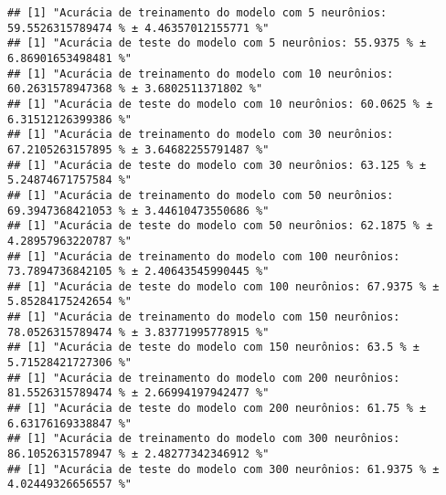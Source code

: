 \documentclass[
]{article}
\newenvironment{Shaded}{\begin{snugshade}}{\end{snugshade}}
\newcommand{\CommentTok}[1]{\textcolor[rgb]{0.56,0.35,0.01}{\textit{#1}}}
\newcommand{\DecValTok}[1]{\textcolor[rgb]{0.00,0.00,0.81}{#1}}
\newcommand{\KeywordTok}[1]{\textcolor[rgb]{0.13,0.29,0.53}{\textbf{#1}}}
\newcommand{\NormalTok}[1]{#1}
\newcommand{\OperatorTok}[1]{\textcolor[rgb]{0.81,0.36,0.00}{\textbf{#1}}}
\newcommand{\StringTok}[1]{\textcolor[rgb]{0.31,0.60,0.02}{#1}}
\begin{document}
\begin{Shaded}
\end{Shaded}

\begin{verbatim}
## [1] "Acurácia de treinamento do modelo com 5 neurônios: 59.5526315789474 % ± 4.46357012155771 %"
## [1] "Acurácia de teste do modelo com 5 neurônios: 55.9375 % ± 6.86901653498481 %"
## [1] "Acurácia de treinamento do modelo com 10 neurônios: 60.2631578947368 % ± 3.6802511371802 %"
## [1] "Acurácia de teste do modelo com 10 neurônios: 60.0625 % ± 6.31512126399386 %"
## [1] "Acurácia de treinamento do modelo com 30 neurônios: 67.2105263157895 % ± 3.64682255791487 %"
## [1] "Acurácia de teste do modelo com 30 neurônios: 63.125 % ± 5.24874671757584 %"
## [1] "Acurácia de treinamento do modelo com 50 neurônios: 69.3947368421053 % ± 3.44610473550686 %"
## [1] "Acurácia de teste do modelo com 50 neurônios: 62.1875 % ± 4.28957963220787 %"
## [1] "Acurácia de treinamento do modelo com 100 neurônios: 73.7894736842105 % ± 2.40643545990445 %"
## [1] "Acurácia de teste do modelo com 100 neurônios: 67.9375 % ± 5.85284175242654 %"
## [1] "Acurácia de treinamento do modelo com 150 neurônios: 78.0526315789474 % ± 3.83771995778915 %"
## [1] "Acurácia de teste do modelo com 150 neurônios: 63.5 % ± 5.71528421727306 %"
## [1] "Acurácia de treinamento do modelo com 200 neurônios: 81.5526315789474 % ± 2.66994197942477 %"
## [1] "Acurácia de teste do modelo com 200 neurônios: 61.75 % ± 6.63176169338847 %"
## [1] "Acurácia de treinamento do modelo com 300 neurônios: 86.1052631578947 % ± 2.48277342346912 %"
## [1] "Acurácia de teste do modelo com 300 neurônios: 61.9375 % ± 4.02449326656557 %"
\end{verbatim}
\end{document}

